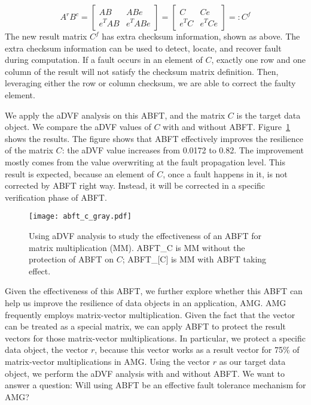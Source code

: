 \scriptsize
\[ A^rB^c=\begin{bmatrix} AB & ABe \\ e^TAB & e^TABe \end{bmatrix} =
\begin{bmatrix} C & Ce \\ e^TC & e^TCe \end{bmatrix} =: C^f \]
\normalsize
The new result matrix $C^f$ has extra checksum information, shown as above. The extra checksum information can be used to detect, locate, and recover fault during computation. 
If a fault occurs in an element of $C$, exactly one row and one column of the result
will not satisfy the checksum matrix definition. 
Then, leveraging either the row or column checksum, we are able to correct the faulty element. 

We apply the aDVF analysis on this ABFT, and the matrix $C$ is the target data object. We compare the aDVF values of $C$
with and without ABFT. Figure~\ref{fig:abft_advf} shows the results.
The figure shows that ABFT effectively improves the resilience of the matrix $C$: the aDVF value increases
from 0.0172 to 0.82. The improvement mostly comes from the value overwriting
at the fault propagation level.
This result is expected, because an element of $C$, once a fault happens in it, is not corrected by ABFT right way.
Instead, it will be corrected in a specific verification phase of ABFT.

\begin{figure}
	\centering
	\texttt{[image: abft\_c\_gray.pdf]}
	\caption{Using aDVF analysis to study the effectiveness of an ABFT for matrix multiplication (MM). ABFT\_C is MM without the protection of ABFT on $C$; ABFT\_[C] is MM with ABFT taking effect.}
	\label{fig:abft_advf}
    \vspace{-10pt}
\end{figure}

Given the effectiveness of this ABFT, we further explore whether this ABFT can help us improve the resilience of data objects in an application, AMG.
AMG frequently employs matrix-vector multiplication. Given the fact that the vector can be treated as a special matrix, we can apply ABFT to protect 
the result vectors for those matrix-vector multiplications.
In particular, we protect a specific data object, the vector $r$, because this vector works as a result vector for 75\% of matrix-vector multiplications in AMG.
Using the vector $r$ as our target data object, we perform the aDVF analysis with and without ABFT.
We want to answer a question: Will using ABFT be an effective fault tolerance mechanism for AMG?

